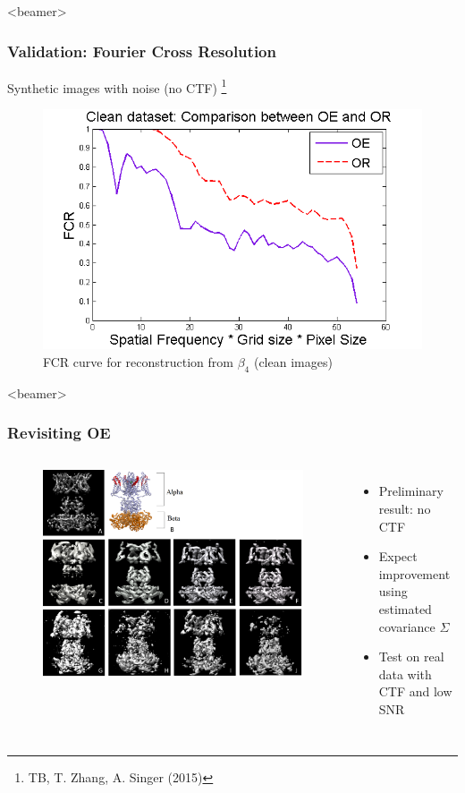 \documentclass{beamer}
\newcommand\blfootnote[1]{%
  \begingroup
  \renewcommand\thefootnote{}\footnote{#1}%
  \addtocounter{footnote}{-1}%
  \endgroup
}
\begin{document}
\begin{frame}<beamer>
\frametitle{Validation: Fourier Cross Resolution}
Synthetic images with noise (no CTF) \blfootnote{TB, T. Zhang, A. Singer (2015)}
\begin{figure}[t]
  \centering
  \includegraphics[width=.8\columnwidth]{figures/FSC_final.png}
  \caption{FCR curve for reconstruction from $\beta_4$ (clean images)}\label{fig:fsc}
\end{figure}
\end{frame}


\begin{frame}<beamer>
\frametitle{Revisiting OE}
 \begin{columns}
\begin{figure}[!htbp]
\begin{center}
\includegraphics[width=.95 \columnwidth]{figures/reconstruction_all.png}
\end{center}
\end{figure}
\begin{itemize}
\item Preliminary result: no CTF
\item Expect improvement using estimated covariance $\Sigma$
\item Test on real data with CTF and low SNR
\end{itemize}
\end{columns}
\end{frame}
\end{document}
